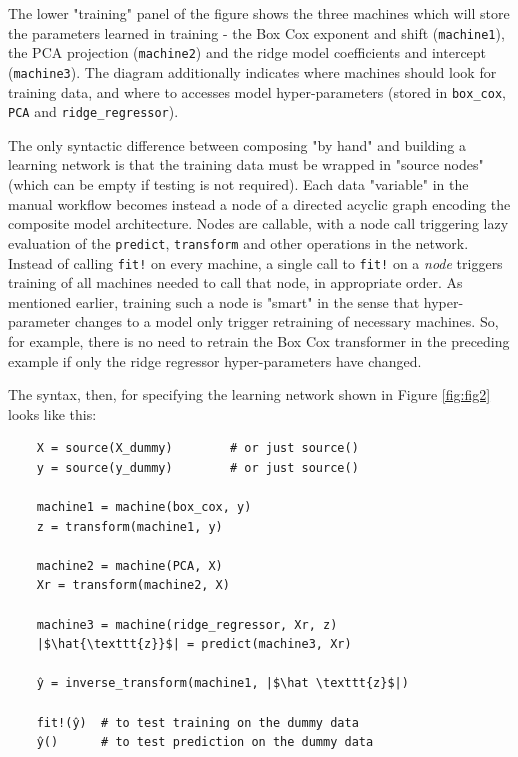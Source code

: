 \documentclass{article}
\begin{document}
The lower "training" panel of the figure shows the three machines which will store the parameters learned in training - the Box Cox exponent and shift (\texttt{machine1}), the PCA projection (\texttt{machine2}) and the ridge model coefficients and intercept (\texttt{machine3}). The diagram additionally indicates where machines should look for training data, and where to accesses model hyper-parameters (stored in \texttt{box\_cox}, \texttt{PCA} and \texttt{ridge\_regressor}).

The only syntactic difference between composing "by hand" and building a learning network is that the training data must be wrapped in "source nodes" (which can be empty if testing is not required). Each data "variable" in the manual workflow becomes instead a node of a directed acyclic graph encoding the composite model architecture. Nodes are callable, with a node call triggering lazy evaluation of the \texttt{predict}, \texttt{transform} and other operations in the network. Instead of calling \texttt{fit!} on every machine, a single call to \texttt{fit!} on a \textit{node} triggers training of all machines needed to call that node, in appropriate order. As mentioned earlier, training such a node is "smart" in the sense that hyper-parameter changes to a model only trigger retraining of necessary machines. So, for example, there is no need to retrain the Box Cox transformer in the preceding example if only the ridge regressor hyper-parameters have changed.

The syntax, then, for specifying the learning network shown in Figure \ref{fig:fig2} looks like this:

\begin{verbatim}
    X = source(X_dummy)        # or just source()
    y = source(y_dummy)        # or just source()
    
    machine1 = machine(box_cox, y)
    z = transform(machine1, y)
    
    machine2 = machine(PCA, X)
    Xr = transform(machine2, X)
    
    machine3 = machine(ridge_regressor, Xr, z)
    |$\hat{\texttt{z}}$| = predict(machine3, Xr)
    
    ŷ = inverse_transform(machine1, |$\hat \texttt{z}$|)
    
    fit!(ŷ)  # to test training on the dummy data
    ŷ()      # to test prediction on the dummy data
\end{verbatim}
\end{document}
